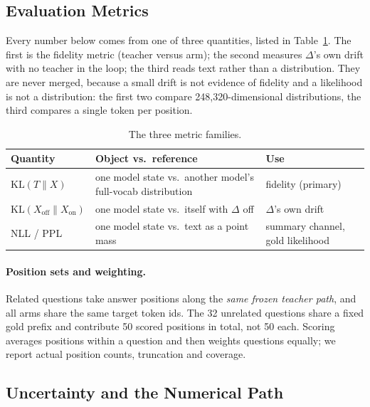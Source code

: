 \documentclass[sigconf,nonacm]{acmart}
\newcommand{\KL}{\mathrm{KL}}
\begin{document}
\subsection{Evaluation Metrics}

Every number below comes from one of three quantities, listed in Table~\ref{tab:metrics}. The first is the
fidelity metric (teacher versus arm); the second measures $\Delta$'s own drift with no teacher in the loop; the
third reads text rather than a distribution. They are never merged, because a small drift is not evidence of
fidelity and a likelihood is not a distribution: the first two compare 248,320-dimensional distributions, the
third compares a single token per position.

\begin{table}[t]
\centering
\small
\begin{tabularx}{\columnwidth}{@{}>{\raggedright\arraybackslash}p{2.3cm}>{\raggedright\arraybackslash}X>{\raggedright\arraybackslash}p{1.7cm}@{}}
\toprule
Quantity & Object vs.\ reference & Use \\
\midrule
$\KL(T\|X)$ & one model state vs.\ another model's full-vocab distribution & fidelity (primary) \\
$\KL(X_{\text{off}}\|X_{\text{on}})$ & one model state vs.\ itself with $\Delta$ off & $\Delta$'s own drift \\
NLL / PPL & one model state vs.\ text as a point mass & summary channel, gold likelihood \\
\bottomrule
\end{tabularx}
\caption{The three metric families.}
\label{tab:metrics}
\end{table}

\paragraph{Position sets and weighting.}

Related questions take answer positions along the \emph{same frozen teacher path}, and all arms share the
same target token ids. The 32 unrelated questions share a fixed gold prefix and contribute 50 scored positions in
total, not 50 each. Scoring averages positions within a question and then weights questions equally; we report
actual position counts, truncation and coverage.

\subsection{Uncertainty and the Numerical Path}\label{sec:unc}
\end{document}

